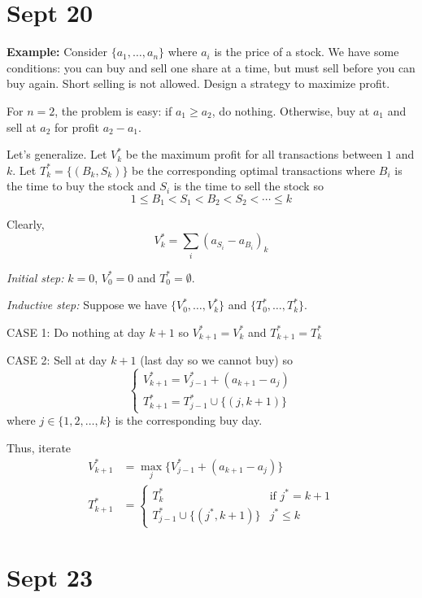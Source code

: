 \documentclass[12pt]{report}
\begin{document}
\section{Sept 20}
    \textbf{Example:} Consider $\{a_1, \dots, a_n\}$ where $a_i$ is the price of a stock. We have some conditions: you can buy and sell one share at a time, but must sell before you can buy again. Short selling is not allowed. Design a strategy to maximize profit.
    
    For $n = 2$, the problem is easy: if $a_1 \geq a_2$, do nothing. Otherwise, buy at $a_1$ and sell at $a_2$ for profit $a_2 - a_1$. 

    Let's generalize. Let $V_k^*$ be the maximum profit for all transactions between $1$ and $k$. Let $T_k^* = \{(B_k, S_k)\}$ be the corresponding optimal transactions where $B_i$ is the time to buy the stock and $S_i$ is the time to sell the stock so  
    \[1 \leq B_1 < S_1 < B_2 < S_2 < \cdots \leq k\]

    Clearly, 
    \[V_k^* = \sum_i (a_{S_i} - a_{B_i})_k\]

    \emph{Initial step:} $k = 0$, $V_0^* = 0$ and $T_0^* = \emptyset$.

    \emph{Inductive step:} Suppose we have $\{V_0^*, \dots, V_k^*\}$ and $\{T_0^*, \dots, T_k^*\}$. 

    CASE 1: Do nothing at day $k+1$ so $V_{k+1}^* = V_k^*$ and $T_{k+1}^* = T_k^*$

    CASE 2: Sell at day $k + 1$ (last day so we cannot buy) so 
    \[\begin{cases}
        V_{k+1}^* = V_{j-1}^* + (a_{k+1} - a_j)\\ 
        T_{k+1}^* = T_{j-1}^* \cup \{(j, k+1)\}
    \end{cases}\]
    where $j \in \{1, 2, \dots, k\}$ is the corresponding buy day. 

    Thus, iterate
    \begin{align*}
        V_{k+1}^* &= \max_{j} \{V_{j-1}^* + (a_{k+1} - a_j)\}\\ 
        T_{k+1}^* &= \begin{cases}
            T_k^* & \text{if } j^* = k + 1\\ 
            T_{j-1}^* \cup \{(j^*, k+1)\} & j^* \leq k
        \end{cases}
    \end{align*}

\section{Sept 23} 
\end{document}

